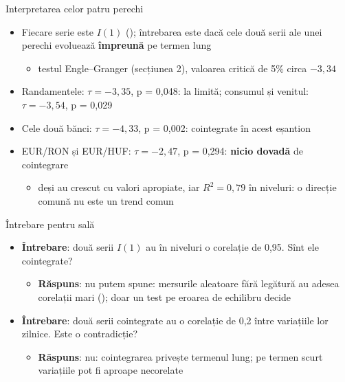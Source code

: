 \begin{frame}{Interpretarea celor patru perechi}
\itemsize{\small}
\begin{itemize}
    \item Fiecare serie este $I(1)$ (); întrebarea este dacă cele două serii ale unei perechi evoluează \textbf{împreună} pe termen lung
    \begin{itemize}
        \item testul Engle--Granger (secțiunea 2), valoarea critică de 5\% circa $-3{,}34$
    \end{itemize}
    \item Randamentele: $\tau = -3{,}35$, p = 0{,}048: la limită; consumul și venitul: $\tau = -3{,}54$, p = 0{,}029
    \item Cele două bănci: $\tau = -4{,}33$, p = 0{,}002: cointegrate în acest eșantion
    \item EUR/RON și EUR/HUF: $\tau = -2{,}47$, p = 0{,}294: \textbf{nicio dovadă} de cointegrare
    \begin{itemize}
        \item deși au crescut cu valori apropiate, iar $R^2 = 0{,}79$ în niveluri: o direcție comună nu este un trend comun
    \end{itemize}
\end{itemize}
\end{frame}

\begin{frame}{Întrebare pentru sală}
\itemsize{\small}
\begin{itemize}
    \item \textbf{Întrebare}: două serii $I(1)$ au în niveluri o corelație de 0,95. Sînt ele cointegrate?
    \begin{itemize}
        \item \textbf{Răspuns}: nu putem spune: mersurile aleatoare fără legătură au adesea corelații mari (); doar un test pe eroarea de echilibru decide
    \end{itemize}
    \item \textbf{Întrebare}: două serii cointegrate au o corelație de 0,2 între variațiile lor zilnice. Este o contradicție?
    \begin{itemize}
        \item \textbf{Răspuns}: nu: cointegrarea privește termenul lung; pe termen scurt variațiile pot fi aproape necorelate
    \end{itemize}
\end{itemize}
\end{frame}

